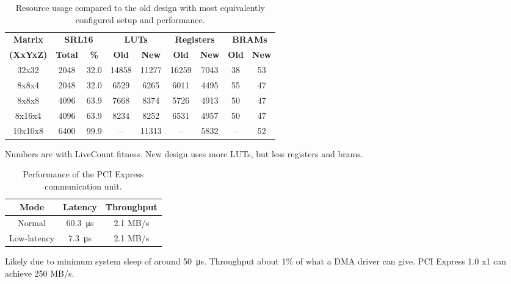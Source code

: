 \begin{table}[!ht]
    \renewcommand{\arraystretch}{1.4}
    \centering
    \begin{tabular}{c|c|c|c|c|c|c|c|c}
        \bfseries Matrix & \multicolumn{2}{c|}{\bfseries SRL16} & \multicolumn{2}{c|}{\bfseries LUTs} & \multicolumn{2}{c|}{\bfseries Registers} & \multicolumn{2}{c}{\bfseries BRAMs} \\
        \bfseries (XxYxZ) & \bfseries Total & \bfseries \% & \bfseries Old & \bfseries New & \bfseries Old & \bfseries New & \bfseries Old & \bfseries New \\
        \hline
        32x32 & 2048 & 32.0 & 14858 & 11277 & 16259 & 7043 & 38 & 53 \\
        8x8x4 & 2048 & 32.0 & 6529 & 6265 & 6011 & 4495 & 55 & 47 \\
        8x8x8 & 4096 & 63.9 & 7668 & 8374 & 5726 & 4913 & 50 & 47 \\
        8x16x4 & 4096 & 63.9 & 8234 & 8252 & 6531 & 4957 & 50 & 47 \\
        10x10x8 & 6400 & 99.9 & – & 11313 & – & 5832 & – & 52 \\
    \end{tabular}
    \caption[Resource usage]{
        Resource usage compared to the old design with most equivalently configured setup and performance.
    }
\end{table}

Numbers are with LiveCount fitness.
New design uses more LUTs, but less registers and brams.


\begin{table}[!ht]
    \renewcommand{\arraystretch}{1.4}
    \centering
    \begin{tabular}{c|c|c}
        \bfseries Mode & \bfseries Latency & \bfseries Throughput \\
        \hline
        Normal & \SI{60.3}{\micro\second} & 2.1 MB/s \\
        Low-latency & \SI{7.3}{\micro\second} & 2.1 MB/s \\
    \end{tabular}
    \caption[Communication performance]{
        Performance of the PCI Express communication unit.
    }
\end{table}

Likely due to minimum system sleep of around \SI{50}{\micro\second}.
Throughput about 1\% of what a DMA driver can give.
PCI Express 1.0 x1 can achieve 250 MB/s.

